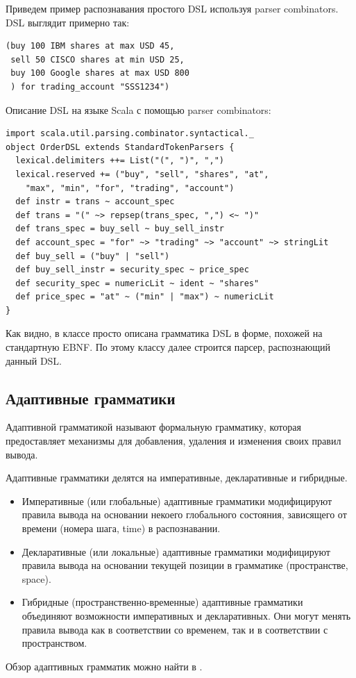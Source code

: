 \documentclass[a4paper,12pt,titlepage]{extarticle}
\begin{document}
Приведем пример распознавания простого DSL используя parser combinators.
DSL выглядит примерно так:
\begin{verbatim} 
(buy 100 IBM shares at max USD 45,
 sell 50 CISCO shares at min USD 25,
 buy 100 Google shares at max USD 800
 ) for trading_account "SSS1234")
\end{verbatim}
Описание DSL на языке Scala с помощью parser combinators:
\begin{verbatim} 
import scala.util.parsing.combinator.syntactical._
object OrderDSL extends StandardTokenParsers {
  lexical.delimiters ++= List("(", ")", ",")
  lexical.reserved += ("buy", "sell", "shares", "at", 
    "max", "min", "for", "trading", "account")
  def instr = trans ~ account_spec
  def trans = "(" ~> repsep(trans_spec, ",") <~ ")"
  def trans_spec = buy_sell ~ buy_sell_instr
  def account_spec = "for" ~> "trading" ~> "account" ~> stringLit
  def buy_sell = ("buy" | "sell")
  def buy_sell_instr = security_spec ~ price_spec
  def security_spec = numericLit ~ ident ~ "shares"
  def price_spec = "at" ~ ("min" | "max") ~ numericLit
}
\end{verbatim}
Как видно, в классе просто описана грамматика DSL в форме, похожей на
стандартную EBNF. По этому классу далее строится парсер, распознающий данный
DSL.

\subsection{Адаптивные грамматики}
\label{adaptive}
Адаптивной грамматикой называют формальную грамматику, которая предоставляет
механизмы для добавления, удаления и изменения своих правил вывода.

Адаптивные грамматики делятся на императивные, декларативные и гибридные.
\begin{itemize}
  \item Императивные (или глобальные) адаптивные грамматики модифицируют правила
  вывода на основании некоего глобального состояния, зависящего от времени
  (номера шага, time) в распознавании.
  \item Декларативные (или локальные) адаптивные грамматики модифицируют правила
  вывода на основании текущей позиции в грамматике (пространстве, space).
  \item Гибридные (пространственно-временные) адаптивные грамматики объединяют
  возможности императивных и декларативных. Они могут менять правила вывода как
  в соответствии со временем, так и в соответствии с пространством.
\end{itemize}
Обзор адаптивных грамматик можно найти в \cite{adaptive}.
\end{document}
